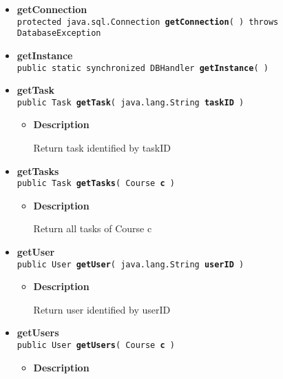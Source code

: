 {{{\begin{itemize}
{\begin{itemize}
{Add new user to user database
}
\end{itemize}
}%
 \item{ 
{\bf getConnection}\\
{\tt protected java.sql.Connection\ {\bf getConnection}(  ) throws DatabaseException
\label{fi.helsinki.cs.kohahdus.DBHandler.getConnection()}}%
}%
 \item{ 
{\bf getInstance}\\
{\tt public static synchronized DBHandler\ {\bf getInstance}(  )
\label{fi.helsinki.cs.kohahdus.DBHandler.getInstance()}}%
}%
 \item{ 
{\bf getTask}\\
{\tt public Task\ {\bf getTask}( {\tt java.lang.String} {\bf taskID} )
\label{fi.helsinki.cs.kohahdus.DBHandler.getTask(java.lang.String)}}%
\begin{itemize}
\item{
{\bf Description}

Return task identified by taskID
}
\end{itemize}
}%
 \item{ 
{\bf getTasks}\\
{\tt public Task\lbrack \rbrack \ {\bf getTasks}( {\tt Course} {\bf c} )
\label{fi.helsinki.cs.kohahdus.DBHandler.getTasks(fi.helsinki.cs.kohahdus.Course)}}%
\begin{itemize}
\item{
{\bf Description}

Return all tasks of Course c
}
\end{itemize}
}%
 \item{ 
{\bf getUser}\\
{\tt public User\ {\bf getUser}( {\tt java.lang.String} {\bf userID} )
\label{fi.helsinki.cs.kohahdus.DBHandler.getUser(java.lang.String)}}%
\begin{itemize}
\item{
{\bf Description}

Return user identified by userID
}
\end{itemize}
}%
 \item{ 
{\bf getUsers}\\
{\tt public User\lbrack \rbrack \ {\bf getUsers}( {\tt Course} {\bf c} )
\label{fi.helsinki.cs.kohahdus.DBHandler.getUsers(fi.helsinki.cs.kohahdus.Course)}}%
\begin{itemize}
\item{
{\bf Description}

}
\end{itemize}}
\end{itemize}}}}
